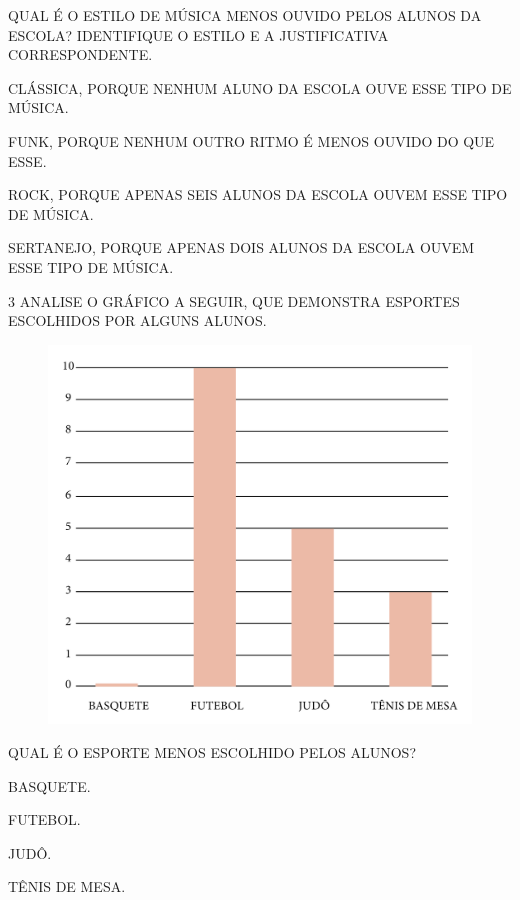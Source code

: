 QUAL É O ESTILO DE MÚSICA MENOS OUVIDO PELOS ALUNOS DA ESCOLA? IDENTIFIQUE O ESTILO E A JUSTIFICATIVA CORRESPONDENTE.

\begin{escolha}
\item CLÁSSICA, PORQUE NENHUM ALUNO DA ESCOLA OUVE ESSE TIPO DE MÚSICA.

\item FUNK, PORQUE NENHUM OUTRO RITMO É MENOS OUVIDO DO QUE ESSE.

\item ROCK, PORQUE APENAS SEIS ALUNOS DA ESCOLA OUVEM ESSE TIPO DE MÚSICA.

\item SERTANEJO, PORQUE APENAS DOIS ALUNOS DA ESCOLA OUVEM ESSE TIPO DE MÚSICA.
\end{escolha}

\pagebreak
\num{3} ANALISE O GRÁFICO A SEGUIR, QUE DEMONSTRA ESPORTES ESCOLHIDOS POR ALGUNS ALUNOS.

\begin{figure}[H]
\centering
\includegraphics[width=\textwidth]{./media/SAEB_1ANO_MAT_FIGURA111.png}
\end{figure}

QUAL É O ESPORTE MENOS ESCOLHIDO PELOS ALUNOS?

\begin{escolha}
\item BASQUETE.

\item FUTEBOL.

\item JUDÔ.

\item TÊNIS DE MESA.
\end{escolha}

\pagebreak